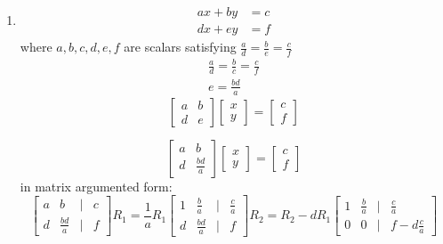 \documentclass[11pt]{article}
\begin{document}
\begin{enumerate}
\begin{enumerate}
    \item \textbf{}
    \[
        \begin{aligned}
            ax + by &= c \\
            dx + ey &= f
        \end{aligned}
    \]
    where \(a, b, c, d, e, f\) are scalars satisfying \(\frac{a}{d} = \frac{b}{e} = \frac{c}{f}\)
    \[
        \begin{aligned}
            \frac{a}{d} = \frac{b}{c} = \frac{c}{f} \\
            e = \frac{bd}{a}
        \end{aligned}
    \]
    \[
        \begin{bmatrix}
            a & b \\
            d & e
        \end{bmatrix}
        \begin{bmatrix}
            x \\
            y
        \end{bmatrix}
        = \begin{bmatrix}
            c \\
            f
        \end{bmatrix}
    \]

    \[
        \begin{bmatrix}
            a & b \\
            d & \frac{bd}{a}
        \end{bmatrix}
        \begin{bmatrix}
            x \\
            y
        \end{bmatrix}
        = \begin{bmatrix}
            c \\
            f
        \end{bmatrix}
    \]
    in matrix argumented form:
    \[
        \begin{bmatrix}
            a & b &|& c \\
            d & \frac{bd}{a} &|& f
        \end{bmatrix}
        R_1 = \frac{1}{a}R_1
        \begin{bmatrix}
            1 & \frac{b}{a} &|& \frac{c}{a} \\
            d & \frac{bd}{a} &|& f
        \end{bmatrix}
        R_2 = R_2 - dR_1
        \begin{bmatrix}
            1 & \frac{b}{a} &|& \frac{c}{a} \\
            0 & 0 &|& f - d\frac{c}{a}
        \end{bmatrix}
    \]


\end{enumerate}
\end{enumerate}
\end{document}
